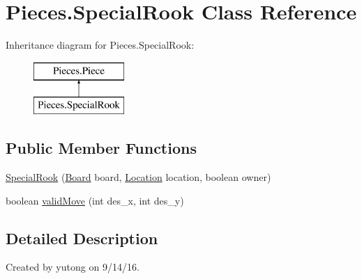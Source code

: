 \hypertarget{classPieces_1_1SpecialRook}{\section{Pieces.\-Special\-Rook Class Reference}
\label{classPieces_1_1SpecialRook}
}
Inheritance diagram for Pieces.\-Special\-Rook\-:\begin{figure}[H]
\begin{center}
\leavevmode
\includegraphics[height=2.000000cm]{classPieces_1_1SpecialRook}
\end{center}
\end{figure}
\subsection*{Public Member Functions}
\begin{DoxyCompactItemize}
\item 
\hyperlink{classPieces_1_1SpecialRook_a9aa8bc9c984f1abb2b625ef5f437e843}{Special\-Rook} (\hyperlink{classPieces_1_1Board}{Board} board, \hyperlink{classPieces_1_1Location}{Location} location, boolean owner)
\item 
boolean \hyperlink{classPieces_1_1SpecialRook_a605a972351e3bc6221a4071112aa179d}{valid\-Move} (int des\-\_\-x, int des\-\_\-y)
\end{DoxyCompactItemize}


\subsection{Detailed Description}
Created by yutong on 9/14/16. 


